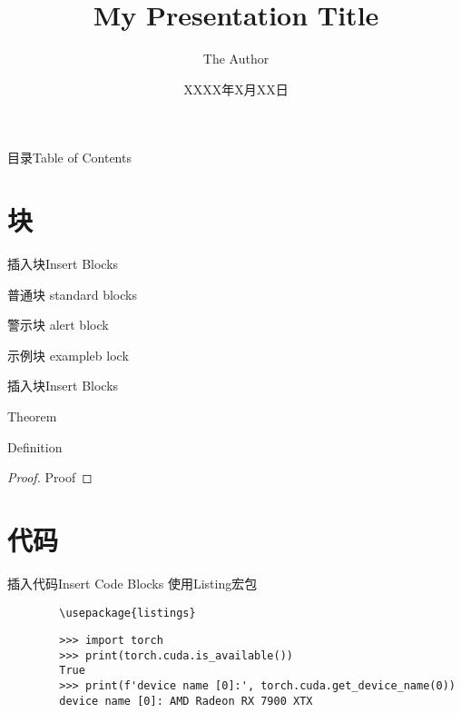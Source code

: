 \documentclass[aspectratio=169, UTF8]{ctexbeamer}
\author{The Author}
\date{XXXX年X月XX日}
\title{My Presentation Title}
\begin{document}
\begin{frame}
    \maketitle
\end{frame}

\begin{frame}{目录}{Table of Contents}
    \centering
    \tableofcontents[hideallsubsections]
\end{frame}

\section[Block]{块}

\begin{frame}{插入块}{Insert Blocks}
    \begin{block}{普通块}
        standard blocks
    \end{block}
    \begin{alertblock}{警示块}
        alert block
    \end{alertblock}
    \begin{exampleblock}{示例块}
        exampleb lock
    \end{exampleblock}
\end{frame}

\begin{frame}{插入块}{Insert Blocks}
    \begin{theorem}
        Theorem
    \end{theorem}
    \begin{definition}
        Definition
    \end{definition}
    \begin{proof}
        Proof
    \end{proof}
\end{frame}
\section[Code block]{代码}

\begin{frame}[fragile]{插入代码}{Insert Code Blocks}
    使用Listing宏包\begin{verbatim}
        \usepackage{listings}
    \end{verbatim}
    \begin{lstlisting}
        >>> import torch
        >>> print(torch.cuda.is_available())
        True
        >>> print(f'device name [0]:', torch.cuda.get_device_name(0))
        device name [0]: AMD Radeon RX 7900 XTX
    \end{lstlisting}
\end{frame}
\end{document}
